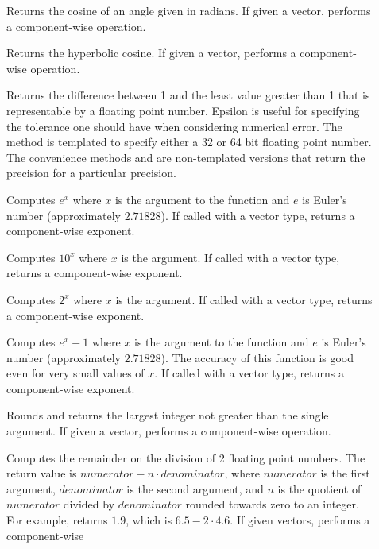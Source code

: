 \begin{description}
\item[]  Returns the cosine of an angle given in
  radians. If given a vector, performs a component-wise operation.
\item[]  Returns the hyperbolic
  cosine. If given a vector, performs a component-wise operation.
\item[] Returns the difference between 1 and the least
  value greater than 1 that is representable by a floating point number.
  Epsilon is useful for specifying the tolerance one should have when
  considering numerical error. The  method is
  templated to specify either a 32 or 64 bit floating point number. The
  convenience methods  and
   are non-templated versions that return the
  precision for a particular precision.
\item[]  Computes $e^x$ where $x$ is the
  argument to the function and $e$ is Euler's number (approximately
  $2.71828$). If called with a vector type, returns a component-wise
  exponent.
\item[] Computes $10^x$ where $x$ is the argument. If called
  with a vector type, returns a component-wise exponent.
\item[] Computes $2^x$ where $x$ is the argument. If called
  with a vector type, returns a component-wise exponent.
\item[] Computes $e^x-1$ where $x$ is the argument to the
  function and $e$ is Euler's number (approximately $2.71828$). The
  accuracy of this function is good even for very small values of $x$. If
  called with a vector type, returns a component-wise exponent.
\item[]   Rounds
  and returns the largest integer not greater than the single argument. If
  given a vector, performs a component-wise operation.
\item[]  Computes the remainder on the
  division of 2 floating point numbers. The return value is $numerator - n
  \cdot denominator$, where $numerator$ is the first argument,
  $denominator$ is the second argument, and $n$ is the quotient of
  $numerator$ divided by $denominator$ rounded towards zero to an
  integer. For example,  returns
  $1.9$, which is $6.5 - 2\cdot4.6$. If given vectors,
   performs a component-wise

\end{description}
